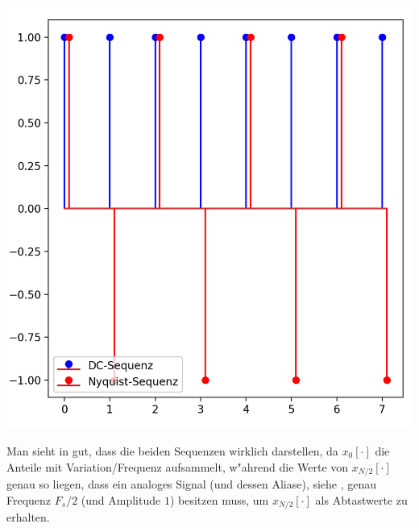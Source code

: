 \begin{listing}[ht]
    \noindent
    \begin{minipage}{0.51\textwidth}
        \strut\vspace*{-\baselineskip}\newline
        \inputminted[firstline=4, lastline=46]{python3}{code/nyquist_seq.py}
    \end{minipage}%
    \begin{minipage}{0.48\textwidth}
        \strut\vspace*{-\baselineskip}\newline
        \includegraphics[width=\textwidth]{code/nyquist_seq.png}
    \end{minipage}
    \label{py:nyquist_seq}
\end{listing}

Man sieht in  gut, dass die beiden Sequenzen wirklich  darstellen, da $x_0[\cdot]$ die Anteile mit  Variation/Frequenz aufsammelt, w"ahrend die Werte von $x_{N/2}[\cdot]$ genau so liegen, dass ein analoges Signal (und dessen Aliase), siehe , genau Frequenz $F_s/2$ (und Amplitude $1$) besitzen muss, um $x_{N/2}[\cdot]$ als Abtastwerte zu erhalten.
%
%
